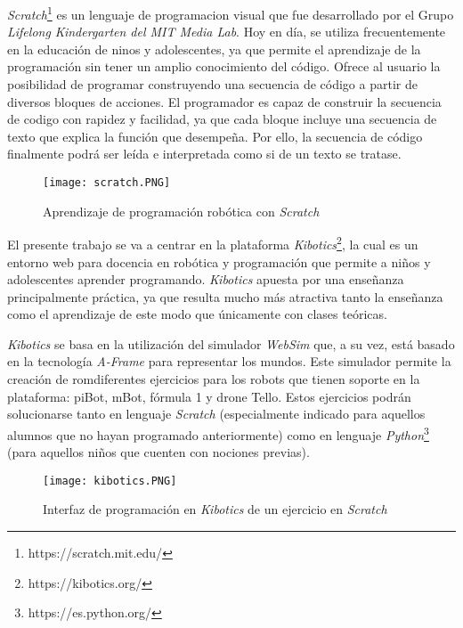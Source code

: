\textit{Scratch}\footnote{https://scratch.mit.edu/} es un lenguaje de programacion visual que fue desarrollado por el Grupo \textit{Lifelong Kindergarten del MIT Media Lab}. Hoy en día, se utiliza frecuentemente en la educación de ninos y adolescentes, ya que permite el aprendizaje de la programación sin tener un amplio conocimiento del código. Ofrece al usuario la posibilidad de programar construyendo una secuencia de código a partir de diversos bloques de acciones. El programador es capaz de construir la secuencia de
codigo con rapidez y facilidad, ya que cada bloque incluye una secuencia de texto que explica la función que desempeña. Por ello, la secuencia de código finalmente podrá ser leída e interpretada como si de un texto se tratase.

\begin{figure}[h!]
    \centering
    \texttt{[image: scratch.PNG]}
    \caption{Aprendizaje de programación robótica con \textit{Scratch}}
    \label{fig:scracth}
\end{figure}

El presente trabajo se va a centrar en la plataforma \textit{Kibotics}\footnote{https://kibotics.org/}, la cual es un entorno web para docencia en robótica y programación que permite a niños y adolescentes aprender programando. \textit{Kibotics}  apuesta por una enseñanza principalmente práctica, ya que resulta mucho más atractiva tanto la enseñanza como el aprendizaje de este modo que únicamente con clases teóricas. \newline

\textit{Kibotics}  se basa en la utilización del simulador \textit{WebSim}  que, a su vez, está basado en la tecnología \textit{A-Frame}  para representar los mundos. Este simulador permite la creación de romdiferentes ejercicios para los robots que tienen soporte en la plataforma: piBot, mBot, fórmula 1 y drone Tello. Estos ejercicios podrán solucionarse tanto en lenguaje \textit{Scratch} (especialmente indicado para aquellos alumnos que no hayan programado anteriormente) como en lenguaje \textit{Python}\footnote{https://es.python.org/} (para aquellos niños que cuenten con nociones previas). \newline

\begin{figure}[h!]
    \centering
    \texttt{[image: kibotics.PNG]}
    \caption{Interfaz de programación en \textit{Kibotics} de un ejercicio en \textit{Scratch}}
    \label{fig:kibotics}
\end{figure}

